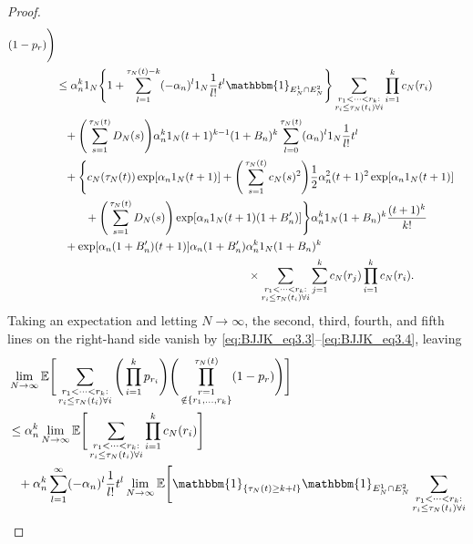 \documentclass[12pt,authoryear]{article}
\theoremstyle{definition}
\newcommand{\E}{\mathbb{E}}
\newcommand{\I}[1]{\mathbbm{1}_{\{#1\}}}
\newcommand{\1}[1]{\mathbbm{1}_{#1}}
\newcommand{\ON}{1_N}
\begin{document}
\begin{proof}
\begin{align*}
        (1-p_r) \Bigg) \\
&\leq \alpha_n^k \ON \Bigg\{
        1+ \sum_{l=1}^{\tau_N(t) -k} (-\alpha_n)^l \ON \frac{1}{l!} t^l
        \1{E_N^1 \cap E_N^2} \Bigg\}
        \sum_{\substack{r_1 <\dots< r_k :\\ r_i \leq \tau_N(t_i) \forall i}}
        \prod_{i=1}^k c_N(r_i) \\
    &\phantom{\leq}+ \Bigg( \sum_{s=1}^{\tau_N(t)} D_N(s) \Bigg)
        \alpha_n^k \ON (t+1)^{k-1} (1+B_n)^k
        \sum_{l=0}^{\tau_N(t)} (\alpha_n)^l \ON \frac{1}{l!} t^l \\
    &\phantom{\leq}+ \Bigg\{ c_N(\tau_N(t)) 
        \exp[ \alpha_n \ON (t+1) ]  + \Bigg( \sum_{s=1}^{\tau_N(t)} c_N(s)^2 \Bigg)
        \frac{1}{2} \alpha_n^2 (t+1)^2 \exp[ \alpha_n \ON (t+1) ] \\
    &\phantom{\leq + \Bigg\{}+ \Bigg( \sum_{s=1}^{\tau_N(t)} D_N(s) \Bigg)
        \exp[ \alpha_n \ON (t+1) (1+B_n^\prime) ] \Bigg\}
        \alpha_n^k \ON (1 + B_n)^k \frac{(t+1)^k}{k!} \\
    &\phantom{\leq}+ \exp[ \alpha_n (1 + B_n^\prime) (t+1) ]
        \alpha_n (1 + B_n^\prime)
        \alpha_n^k \ON (1 + B_n)^k \\
    &\hspace{6cm}\times \sum_{\substack{r_1 <\dots< r_k 
        :\\ r_i \leq \tau_N(t_i) \forall i}}
        \sum_{j=1}^k c_N(r_j)
        \prod_{i=1}^k c_N(r_i) .
\end{align*}
Taking an expectation and letting $N \to \infty$, the second, third, fourth, and fifth lines on the right-hand side vanish by \eqref{eq:BJJK_eq3.3}--\eqref{eq:BJJK_eq3.4}, leaving
\begin{align}
&\lim_{N\to\infty} \E \Bigg[ 
        \sum_{\substack{r_1 <\dots< r_k :\\ r_i \leq \tau_N(t_i) \forall i}}
        \Bigg( \prod_{i=1}^k p_{r_i} \Bigg)
        \Bigg( \prod_{\substack{r=1 \\ \notin \{r_1,\dots,r_k\} }}^{\tau_N(t)} 
        (1-p_r) \Bigg) \Bigg] \notag \\
&\leq \alpha_n^k \lim_{N\to\infty} \E \Bigg[
        \sum_{\substack{r_1 <\dots< r_k :\\ r_i \leq \tau_N(t_i) \forall i}}
        \prod_{i=1}^k c_N(r_i) \Bigg] \notag\\
    &\phantom{\leq} + \alpha_n^k
        \sum_{l=1}^{\infty} (-\alpha_n)^l \frac{1}{l!} t^l
        \lim_{N\to\infty} \E \Bigg[ \I{\tau_N(t)\geq k+l} \1{E_N^1 \cap E_N^2}
        \sum_{\substack{r_1 <\dots< r_k :\\ r_i \leq \tau_N(t_i) \forall i}}

\end{align}
\end{proof}
\end{document}
